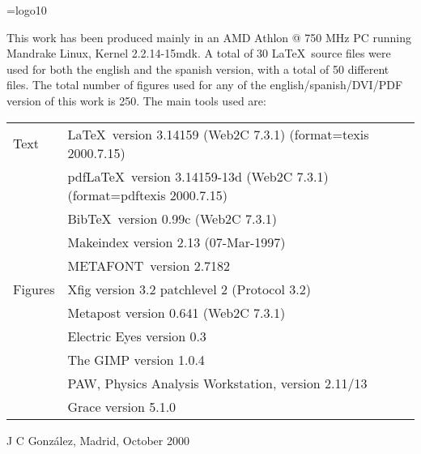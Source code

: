 
\thispagestyle{empty}
%
\mbox{}
%
\newpage
%
\thispagestyle{empty}
%
\mbox{}
%
\vfill
%
\scriptsize

\font\logo=logo10
\def\MF{\strut\hbox{\logo METAFONT}}\def\.#1{\strut\hbox{\tt #1}}

This work has been produced mainly in an AMD Athlon @ 750 MHz PC
running Mandrake Linux, Kernel 2.2.14-15mdk. A total of 30 \LaTeX\ 
source files were used for both the english and the spanish version,
with a total of 50 different files. The total number of figures used
for any of the english/spanish/DVI/PDF version of this work is 250.
The main tools used are:\\

\begin{tabular}{ll}

Text
 & \LaTeX\ version 3.14159 (Web2C 7.3.1) (format=texis 2000.7.15)\\
 & pdf\LaTeX\ version 3.14159-13d (Web2C 7.3.1) (format=pdftexis 2000.7.15)\\
 & Bib\TeX\ version 0.99c (Web2C 7.3.1)\\
 & Makeindex version 2.13 (07-Mar-1997)\\
 & \MF\ version 2.7182 \vspace{4pt}\\

Figures
 & Xfig  version 3.2 patchlevel 2 (Protocol 3.2)\\
 & Metapost version 0.641 (Web2C 7.3.1)\\
 & Electric Eyes version 0.3\\
 & The GIMP version 1.0.4\\
 & PAW, Physics Analysis Workstation, version 2.11/13 \\
 & Grace version 5.1.0\\

\end{tabular}

\raggedleft J C Gonz\'alez, Madrid, October 2000
\endinput
%

